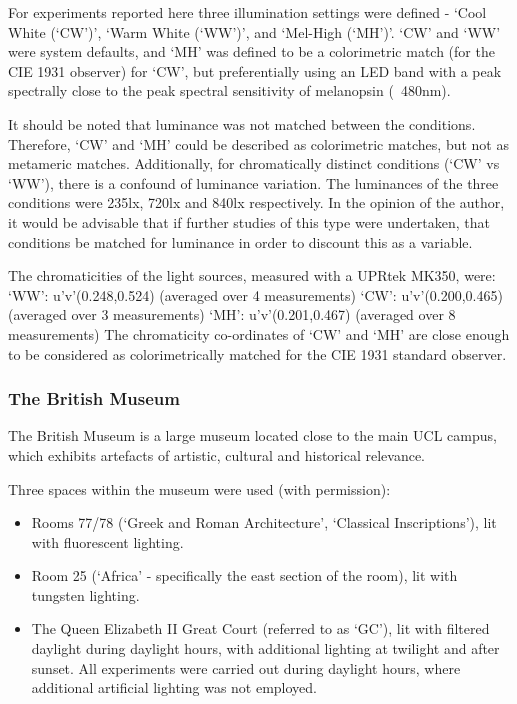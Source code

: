 For experiments reported here three illumination settings were defined - `Cool White (`CW')', `Warm White (`WW')', and `Mel-High (`MH')'. `CW' and `WW' were system defaults, and `MH' was defined to be a colorimetric match (for the CIE 1931 observer) for `CW', but preferentially using an \gls{LED} band with a peak spectrally close to the peak spectral sensitivity of melanopsin (~480nm).


It should be noted that luminance was not matched between the conditions. Therefore, `CW' and `MH' could be described as colorimetric matches, but not as metameric matches. Additionally, for chromatically distinct conditions (`CW' vs `WW'), there is a confound of luminance variation. The luminances of the three conditions were 235lx, 720lx and 840lx respectively. In the opinion of the author, it would be advisable that if further studies of this type were undertaken, that conditions be matched for luminance in order to discount this as a variable. 

The chromaticities of the light sources, measured with a UPRtek MK350, were:
`WW': 	u'v'(0.248,0.524) (averaged over 4 measurements)
`CW': 	u'v'(0.200,0.465) (averaged over 3 measurements)
`MH': 	u'v'(0.201,0.467) (averaged over 8 measurements)
The chromaticity co-ordinates of `CW' and `MH' are close enough to be considered as colorimetrically matched for the CIE 1931 standard observer. %


\subsubsection{The British Museum} \label{sec:BM}

The British Museum is a large museum located close to the main \gls{UCL} campus, which exhibits artefacts of artistic, cultural and historical relevance. 

Three spaces within the museum were used (with permission):

\begin{itemize}
    \item Rooms 77/78 (`Greek and Roman Architecture', `Classical Inscriptions'), lit with fluorescent lighting.
    \item Room 25 (`Africa' - specifically the east section of the room), lit with tungsten  lighting.
    \item The Queen Elizabeth II Great Court (referred to as `GC'), lit with filtered daylight \citep{foster_and_partners_london._great_2002} during daylight hours, with additional lighting at twilight and after sunset. All experiments were carried out during daylight hours, where additional artificial lighting was not employed.
\end{itemize}

